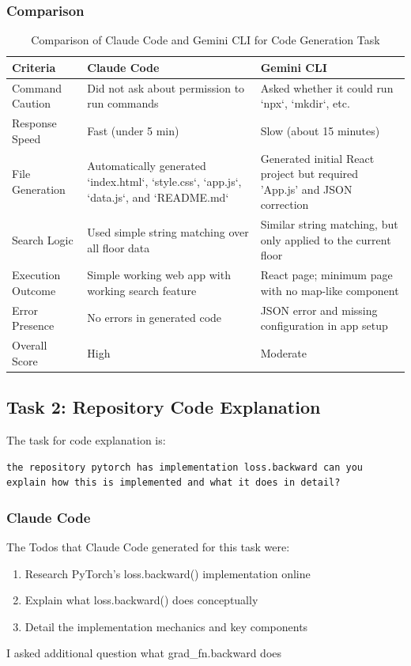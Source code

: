 \documentclass[10pt]{article}
\begin{document}
\subsubsection{Comparison}
\begin{table}[h]
\centering
\caption{Comparison of Claude Code and Gemini CLI for Code Generation Task}
\label{tab:code_generation_comparison}
\renewcommand{\arraystretch}{1.2}
\begin{tabular}{|p{4cm}|p{5.5cm}|p{5.5cm}|}
\hline
\textbf{Criteria} & \textbf{Claude Code} & \textbf{Gemini CLI} \\
\hline
Command Caution & Did not ask about permission to run commands & Asked whether it could run `npx`, `mkdir`, etc. \\
\hline
Response Speed & Fast (under 5 min) & Slow (about 15 minutes) \\
\hline
File Generation & Automatically generated `index.html`, `style.css`, `app.js`, `data.js`, and `README.md` & Generated initial React project but required 'App.js' and JSON correction \\
\hline
Search Logic & Used simple string matching over all floor data & Similar string matching, but only applied to the current floor \\
\hline
Execution Outcome & Simple working web app with working search feature & React page; minimum page with no map-like component \\
\hline
Error Presence & No errors in generated code & JSON error and missing configuration in app setup \\
\hline
Overall Score & High & Moderate \\
\hline
\end{tabular}
\end{table}

\subsection{Task 2: Repository Code Explanation}
The task for code explanation is:
\begin{verbatim}
the repository pytorch has implementation loss.backward can you explain how this is implemented and what it does in detail?
\end{verbatim}
\subsubsection{Claude Code}
The Todos that Claude Code generated for this task were:
\begin{enumerate}
    \item Research PyTorch's loss.backward() implementation online
    \item Explain what loss.backward() does conceptually
    \item Detail the implementation mechanics and key components
\end{enumerate}
I asked additional question what grad_fn.backward does
\end{document}
